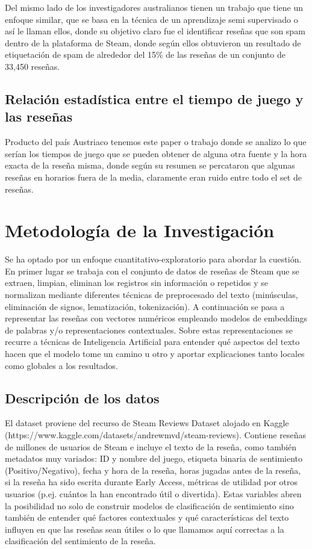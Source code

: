 \documentclass{article}
\begin{document}
Del mismo lado de los investigadores australianos tienen un trabajo que tiene un enfoque similar, que se basa en la técnica de un aprendizaje semi supervisado o así le llaman ellos, donde su objetivo claro fue el identificar reseñas que son spam dentro de la plataforma de Steam, donde según ellos obtuvieron un resultado de etiquetación de spam de alrededor del 15\% de las reseñas de un conjunto de 33,450  reseñas. 

\subsection{Relación estadística entre el tiempo de juego y las reseñas}
Producto del país Austriaco tenemos este paper o trabajo donde se analizo lo que serían los tiempos de juego que se pueden obtener de alguna otra fuente y la hora exacta de la reseña misma, donde según su resumen se percataron que algunas reseñas en horarios fuera de la media, claramente eran ruido entre todo el set de reseñas.

\section{Metodología de la Investigación}

Se ha optado por un enfoque cuantitativo-exploratorio para abordar la cuestión. En primer lugar se trabaja con el conjunto de datos de reseñas de Steam que se extraen, limpian, eliminan los registros sin información o repetidos y se normalizan mediante diferentes técnicas de preprocesado del texto (minúsculas, eliminación de signos, lematización, tokenización). A continuación se pasa a representar las reseñas con vectores numéricos empleando modelos de embeddings de palabras y/o representaciones contextuales. Sobre estas representaciones se recurre a técnicas de Inteligencia Artificial para entender qué aspectos del texto hacen que el modelo tome un camino u otro y aportar explicaciones tanto locales como globales a los resultados.

\subsection{Descripción de los datos}
El dataset proviene del recurso de Steam Reviews Dataset alojado en Kaggle (https://www.kaggle.com/datasets/andrewmvd/steam-reviews). Contiene reseñas de millones de usuarios de Steam e incluye el texto de la reseña, como también metadatos muy variados: ID y nombre del juego, etiqueta binaria de sentimiento (Positivo/Negativo), fecha y hora de la reseña, horas jugadas antes de la reseña, si la reseña ha sido escrita durante Early Access, métricas de utilidad por otros usuarios (p.ej. cuántos la han encontrado útil o divertida). Estas variables abren la posibilidad no solo de construir modelos de clasificación de sentimiento sino también de entender qué factores contextuales y qué características del texto influyen en que las reseñas sean útiles o lo que llamamos aquí correctas a la clasificación del sentimiento de la reseña.
\end{document}
